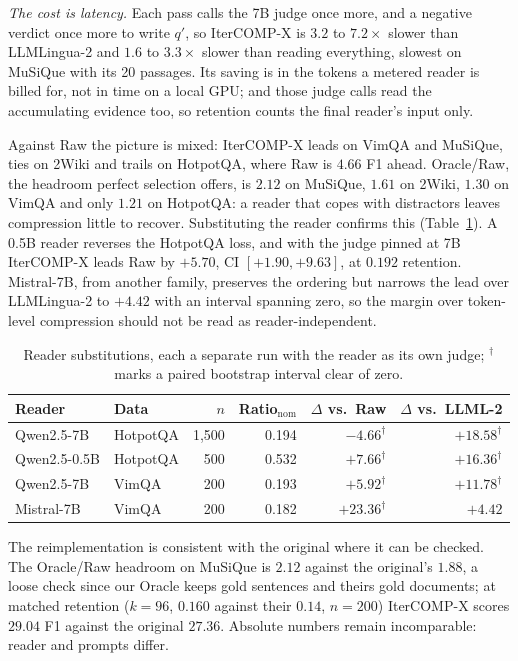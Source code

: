 \documentclass[runningheads]{llncs}
\begin{document}
\emph{The cost is latency.} Each pass calls the 7B judge once more, and a
negative verdict once more to write $q'$, so IterCOMP-X is $3.2$ to $7.2\times$
slower than LLMLingua-2 and $1.6$ to $3.3\times$ slower than reading everything,
slowest on MuSiQue with its 20 passages. Its saving is in the tokens a metered
reader is billed for, not in time on a local GPU; and those judge calls read the
accumulating evidence too, so retention counts the final reader's input only.

Against Raw the picture is mixed: IterCOMP-X leads on VimQA and MuSiQue, ties on
2Wiki and trails on HotpotQA, where Raw is $4.66$ F1 ahead. Oracle/Raw, the
headroom perfect selection offers, is $2.12$ on MuSiQue, $1.61$ on 2Wiki, $1.30$
on VimQA and only $1.21$ on HotpotQA: a reader that copes with distractors
leaves compression little to recover. Substituting the reader confirms this
(Table~\ref{tab:readers}). A 0.5B reader reverses the HotpotQA loss, and with the
judge pinned at 7B IterCOMP-X leads Raw by $+5.70$, CI $[+1.90,+9.63]$, at $0.192$
retention. Mistral-7B, from another family, preserves the ordering but narrows
the lead over LLMLingua-2 to $+4.42$ with an interval spanning zero, so the
margin over token-level compression should not be read as reader-independent.

\begin{table}[H]
\centering
\caption{Reader substitutions, each a separate run with the reader as its own
judge; $^\dag$ marks a paired bootstrap interval clear of zero.}
\label{tab:readers}
\small
\setlength{\tabcolsep}{5pt}
\begin{tabular}{llrrrr}
\toprule
Reader & Data & $n$ & Ratio$_\text{nom}$ & $\Delta$ vs.\ Raw & $\Delta$ vs.\ LLML-2 \\
\midrule
Qwen2.5-7B    & HotpotQA & 1,500 & 0.194 & $-4.66^\dag$  & $+18.58^\dag$ \\
Qwen2.5-0.5B  & HotpotQA & 500   & 0.532 & $+7.66^\dag$  & $+16.36^\dag$ \\
Qwen2.5-7B    & VimQA    & 200   & 0.193 & $+5.92^\dag$  & $+11.78^\dag$ \\
Mistral-7B    & VimQA    & 200   & 0.182 & $+23.36^\dag$ & $+4.42$ \\
\bottomrule
\end{tabular}
\end{table}

The reimplementation is consistent with the original where it can be checked.
The Oracle/Raw headroom on MuSiQue is $2.12$ against the original's $1.88$, a
loose check since our Oracle keeps gold sentences and theirs gold documents; at
matched retention
($k=96$, $0.160$ against their $0.14$, $n=200$) IterCOMP-X scores $29.04$ F1
against the original $27.36$. Absolute numbers remain incomparable: reader and
prompts differ.
\end{document}
